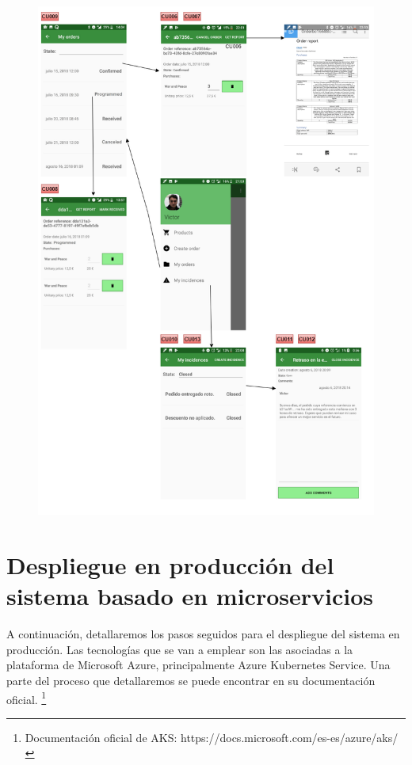 \documentclass[11pt,spanish,listoffigures]{tfgetsinf}
\begin{document}
\begin{figure}[h]
\centering
\includegraphics[scale=0.8]{ModeloUI2}
\end{figure}

%

\chapter{Despliegue en producción del sistema basado en microservicios} \label{chap:Despliegue}

A continuación, detallaremos los pasos seguidos para el despliegue del sistema en producción. Las tecnologías que se van a emplear son las asociadas a la plataforma de Microsoft Azure, principalmente Azure Kubernetes Service. Una parte del proceso que detallaremos se puede encontrar en su documentación oficial. \footnote{Documentación oficial de AKS: https://docs.microsoft.com/es-es/azure/aks/}
\end{document}
